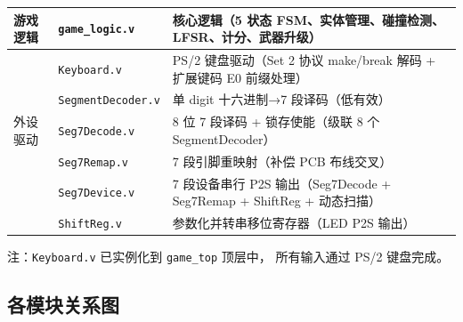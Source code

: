 \documentclass[12pt,a4paper]{ctexart}
\begin{document}
\begin{longtable}{llp{5.5cm}}
\midrule
游戏逻辑 & \texttt{game\_logic.v} & 核心逻辑（5 状态 FSM、实体管理、碰撞检测、LFSR、计分、武器升级） \\
\midrule
\multirow{5}{*}{外设驱动} & \texttt{Keyboard.v} & PS/2 键盘驱动（Set 2 协议 make/break 解码 + 扩展键码 E0 前缀处理） \\
                        & \texttt{SegmentDecoder.v} & 单 digit 十六进制→7 段译码（低有效） \\
                        & \texttt{Seg7Decode.v} & 8 位 7 段译码 + 锁存使能（级联 8 个 SegmentDecoder） \\
                        & \texttt{Seg7Remap.v} & 7 段引脚重映射（补偿 PCB 布线交叉） \\
                        & \texttt{Seg7Device.v} & 7 段设备串行 P2S 输出（Seg7Decode + Seg7Remap + ShiftReg + 动态扫描） \\
                        & \texttt{ShiftReg.v} & 参数化并转串移位寄存器（LED P2S 输出） \\
\end{longtable}

注：\texttt{Keyboard.v} 已实例化到 \texttt{game\_top} 顶层中，
所有输入通过 PS/2 键盘完成。

\subsection{各模块关系图}
\end{document}
